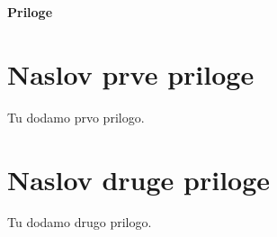 \documentclass[12pt,a4paper,titlepage,openany]{report}
\begin{document}
\pagestyle{fancyplain}
\vspace*{\fill}
     \begin{center}
          \bf{\Huge{Priloge}}
     \end{center}
\vspace*{\fill}
\thispagestyle{fancy}

\appendix
\thispagestyle{empty}

\chapter{Naslov prve priloge}
\thispagestyle{empty}
Tu dodamo prvo prilogo.


\chapter{Naslov druge priloge}
\thispagestyle{empty}
Tu dodamo drugo prilogo.


\end{document}
